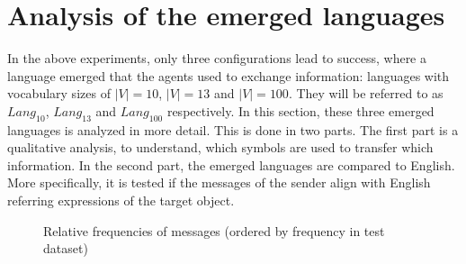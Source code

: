 \section{Analysis of the emerged languages}
\label{sec:analysis_language}
In the above experiments, only three configurations lead to success, where a language emerged that the agents used to exchange information: languages with vocabulary sizes of $|V| = 10$, $|V| = 13$ and $|V| = 100$.
They will be referred to as $Lang_{10}$, $Lang_{13}$ and $Lang_{100}$ respectively.
In this section, these three emerged languages is analyzed in more detail.
This is done in two parts.
The first part is a qualitative analysis, to understand, which symbols are used to transfer which information.
In the second part, the emerged languages are compared to English.
More specifically, it is tested if the messages of the sender align with English referring expressions of the target object.

\begin{figure}[ht]
    \centering
    \caption{Relative frequencies of messages (ordered by frequency in test dataset)}
    \label{fig:relative_frequencies_vocabularies}
\end{figure}

